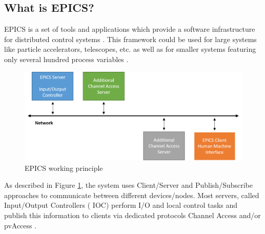 


\subsection{What is EPICS?} 
\label{EPICS}
EPICS is a set of tools and applications which provide a software infrastructure for distributed control systems \cite{EPICS_license}. This framework could be used for large systems like particle accelerators, telescopes, etc. as well as for smaller systems featuring only several hundred process variables \cite{EPICS_1, EPICS_2, EPICS_3, EPICS_4}.
\begin{figure}[!h]
\centering
\includegraphics[width=0.7\columnwidth]{Chapter3/Controls/images/EPICS.png}
\caption{EPICS working principle}
\label{fig_EPICS}
\end{figure}
As described in Figure \ref{fig_EPICS}, the system uses Client/Server and Publish/Subscribe approaches to communicate between different devices/nodes. Most servers, called Input/Output Controllers ( \gls{IOC}) perform I/O and local control tasks and publish this information to clients via dedicated protocols Channel Access and/or pvAccess \cite{EPICS}. 

